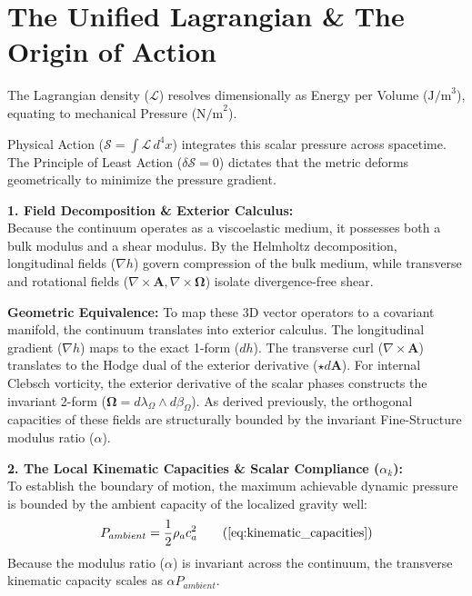 \vspace{0.2 cm}


\section{The Unified Lagrangian \& The Origin of Action} 
\label{sec:deriv_unified_lagrangian}

The Lagrangian density ($\mathcal{L}$) resolves dimensionally as Energy per Volume ($\text{J/m}^3$), equating to mechanical Pressure ($\text{N/m}^2$). 

Physical Action ($\mathcal{S} = \int \mathcal{L} \, d^4x$) integrates this scalar pressure across spacetime. The Principle of Least Action ($\delta \mathcal{S} = 0$) dictates that the metric deforms geometrically to minimize the pressure gradient. 

\vspace{0.2 cm}

\textbf{1. Field Decomposition \& Exterior Calculus:} \\ 
Because the continuum operates as a viscoelastic medium, it possesses both a bulk modulus and a shear modulus. By the Helmholtz decomposition, longitudinal fields ($\nabla h$) govern compression of the bulk medium, while transverse and rotational fields ($\nabla \times \mathbf{A}, \nabla \times \boldsymbol{\Omega}$) isolate divergence-free shear. 

\textbf{Geometric Equivalence: }To map these 3D vector operators to a covariant manifold, the continuum translates into exterior calculus. The longitudinal gradient ($\nabla h$) maps to the exact 1-form ($dh$). The transverse curl ($\nabla \times \mathbf{A}$) translates to the Hodge dual of the exterior derivative ($\star d\mathbf{A}$). For internal Clebsch vorticity, the exterior derivative of the scalar phases constructs the invariant 2-form ($\boldsymbol{\Omega} = d\lambda_\Omega \wedge d\beta_\Omega$). As derived previously, the orthogonal capacities of these fields are structurally bounded by the invariant Fine-Structure modulus ratio ($\alpha$). 

\vspace{0.2 cm}

\textbf{2. The Local Kinematic Capacities \& Scalar Compliance ($\alpha_k$):} \\
To establish the boundary of motion, the maximum achievable dynamic pressure is bounded by the ambient capacity of the localized gravity well: 
\begin{equation}
    P_{ambient} = \frac{1}{2}\rho_a c_a^2 \tag{\ref{eq:kinematic_capacities}}
\end{equation}
Because the modulus ratio ($\alpha$) is invariant across the continuum, the transverse kinematic capacity scales as $\alpha P_{ambient}$. 

